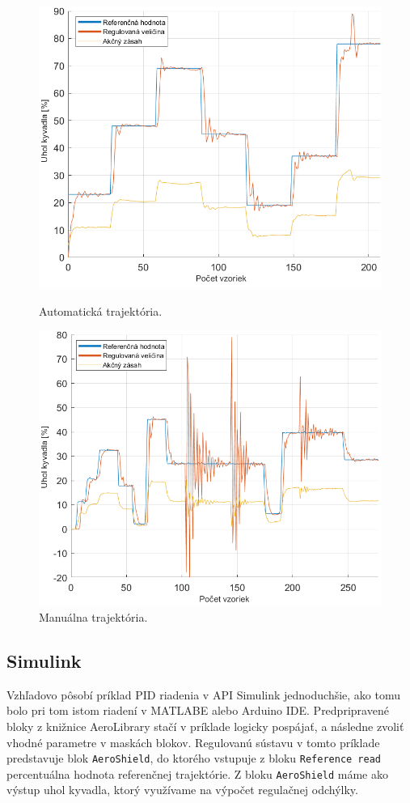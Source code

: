 \begin{figure}[!tbh]
	\centering
	\includegraphics[width=125mm]{obr/PIDautomaMat.png}
	\caption{Automatická trajektória.}\label{OBRAZOK 2.6.2}
	
	\centering
	\includegraphics[width=125mm]{obr/pidmanualbuch.png}
	\caption{Manuálna trajektória.}\label{OBRAZOK 2.6.3}
\end{figure}

\newpage 
\subsection{Simulink}

Vzhľadovo pôsobí príklad PID riadenia v API Simulink jednoduchšie, ako tomu bolo pri tom istom riadení v MATLABE alebo Arduino IDE. Predpripravené bloky z knižnice AeroLibrary stačí v príklade logicky pospájať, a následne zvoliť vhodné parametre v maskách blokov. Regulovanú sústavu v tomto príklade predstavuje blok \verb|AeroShield|, do ktorého vstupuje z bloku \verb|Reference read| percentuálna hodnota referenčnej trajektórie. Z bloku \verb|AeroShield| máme ako výstup uhol kyvadla, ktorý využívame na výpočet regulačnej odchýlky.  

